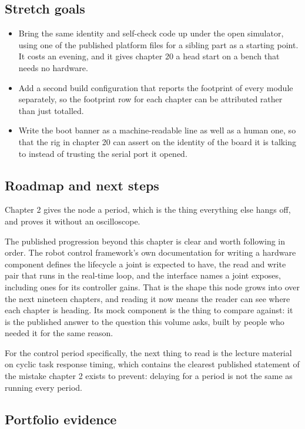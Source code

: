 \subsection*{Stretch goals}

\begin{itemize}
\item Bring the same identity and self-check code up under the open simulator,
using one of the published platform files for a sibling part as a starting
point. It costs an evening, and it gives chapter 20 a head start on a bench that
needs no hardware.
\item Add a second build configuration that reports the footprint of every
module separately, so the footprint row for each chapter can be attributed
rather than just totalled.
\item Write the boot banner as a machine-readable line as well as a human one,
so that the rig in chapter 20 can assert on the identity of the board it is
talking to instead of trusting the serial port it opened.
\end{itemize}

\subsection*{Roadmap and next steps}

Chapter 2 gives the node a period, which is the thing everything else hangs off,
and proves it without an oscilloscope.

The published progression beyond this chapter is clear and worth following in
order. The robot control framework's own documentation for writing a hardware
component defines the lifecycle a joint is expected to have, the read and write
pair that runs in the real-time loop, and the interface names a joint exposes,
including ones for its controller gains. That is the shape this node grows into
over the next nineteen chapters, and reading it now means the reader can see
where each chapter is heading. Its mock component is the thing to compare
against: it is the published answer to the question this volume asks, built by
people who needed it for the same reason.

For the control period specifically, the next thing to read is the lecture
material on cyclic task response timing, which contains the clearest published
statement of the mistake chapter 2 exists to prevent: delaying for a period is
not the same as running every period.

\subsection*{Portfolio evidence}

